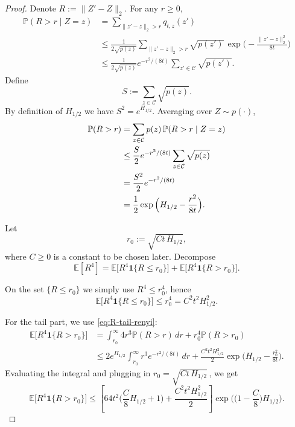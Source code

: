 \documentclass[11pt]{article}
\theoremstyle{definition}
\newcommand{\indic}{\mathbf{1}}
\numberwithin{equation}{section}
\begin{document}
\begin{proof}
Denote \(R := \|Z'-Z\|_2.\)
For any $r\ge0$,
\begin{align*}
\mathbb P(R> r\mid Z=z)
&= \sum_{\|z'-z\|_2 > r} q_{t,z}(z') \\
&\le \frac{1}{2\sqrt{p(z)}}
\sum_{\|z'-z\|_2 > r} \sqrt{p(z')}\,
\exp\Big(-\frac{\|z'-z\|_2^2}{8t}\Big) \\
&\le \frac{1}{2\sqrt{p(z)}} e^{-r^2/(8t)} \sum_{z'\in\mathcal C}\sqrt{p(z')}.
\end{align*}
Define
\[
S := \sum_{z\in\mathcal C}\sqrt{p(z)}.
\]
By definition of $H_{1/2}$ we have $S^2 = e^{H_{1/2}}$.
Averaging over $Z\sim p(\cdot)$,
\begin{align}
\mathbb P(R > r)
&= \sum_{z\in\mathcal C} p(z)\,\mathbb P(R> r\mid Z=z) \notag\\
&\le \frac{S}{2}e^{-r^2/(8t)}\sum_{z\in\mathcal C}\sqrt{p(z)} \notag\\
&= \frac{S^2}{2}e^{-r^2/(8t)}\notag\\
&= \frac{1}{2}\exp\Big(H_{1/2}-\frac{r^2}{8t}\Big).
\label{eq:R-tail-renyi}
\end{align}

Let
\[
r_0 := \sqrt{Ct\,H_{1/2}},
\]
where $C\ge 0$ is a constant to be chosen later.
Decompose
\[
\mathbb E[R^4]
= \mathbb E\big[R^4\indic\{R\le r_0\}\big]
+ \mathbb E\big[R^4\indic\{R> r_0\}\big].
\]

On the set $\{R\le r_0\}$ we simply use $R^4\le r_0^4$, hence
\begin{equation}\label{eq:R4-inner}
\mathbb E\big[R^4\indic\{R\le r_0\}\big]
\le r_0^4
= C^2 t^2 H_{1/2}^2.
\end{equation}

For the tail part, we use \eqref{eq:R-tail-renyi}: 
\begin{align*}
\mathbb E\big[R^4\indic\{R> r_0\}\big]
&= \int_{r_0}^\infty 4r^3 \mathbb P(R > r)\,dr + r_0^4 \mathbb P(R > r_0)\\
&\le 2 e^{H_{1/2}}\int_{r_0}^\infty r^3 e^{-r^2/(8t)}\,dr + \frac{C^2 t^2 H_{1/2}^2}{2}\exp\Big(H_{1/2}-\frac{r_0^2}{8t}\Big).
\end{align*}
Evaluating the integral and plugging in $r_0 = \sqrt{Ct\,H_{1/2}}$\,, we get
\begin{equation}\label{eq:R4-outer-raw}
\mathbb E\big[R^4\indic\{R> r_0\}\big]
\le
\left[64 t^2\Big(\frac{C}{8}H_{1/2}+1\Big)+ \frac{C^2 t^2 H_{1/2}^2}{2}\right]
\exp\Big(\Big(1-\frac{C}{8}\Big)H_{1/2}\Big)
.
\end{equation}


\end{proof}
\end{document}
